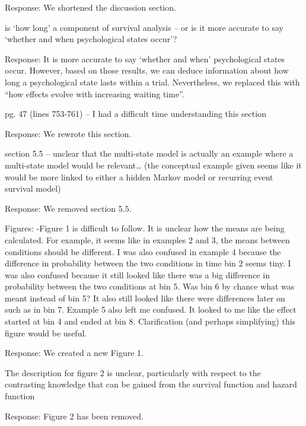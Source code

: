 \documentclass[
]{article}
\renewenvironment{quote}{\begin{leftbar}}{\end{leftbar}}
\begin{document}
Response: We shortened the discussion section.

\begin{quote}
is `how long' a component of survival analysis -- or is it more accurate
to say `whether and when psychological states occur'?
\end{quote}

Response: It is more accurate to say `whether and when' psychological
states occur. However, based on those results, we can deduce information
about how long a psychological state lasts within a trial. Nevertheless,
we replaced this with ``how effects evolve with increasing waiting
time''.

\begin{quote}
pg. 47 (lines 753-761) -- I had a difficult time understanding this
section
\end{quote}

Response: We rewrote this section.

\begin{quote}
section 5.5 -- unclear that the multi-state model is actually an example
where a multi-state model would be relevant\ldots{} (the conceptual
example given seems like it would be more linked to either a hidden
Markov model or recurring event survival model)
\end{quote}

Response: We removed section 5.5.

\begin{quote}
Figures: -Figure 1 is difficult to follow. It is unclear how the means
are being calculated. For example, it seems like in examples 2 and 3,
the means between conditions should be different. I was also confused in
example 4 because the difference in probability between the two
conditions in time bin 2 seems tiny. I was also confused because it
still looked like there was a big difference in probability between the
two conditions at bin 5. Was bin 6 by chance what was meant instead of
bin 5? It also still looked like there were differences later on such as
in bin 7. Example 5 also left me confused. It looked to me like the
effect started at bin 4 and ended at bin 8. Clarification (and perhaps
simplifying) this figure would be useful.
\end{quote}

Response: We created a new Figure 1.

\begin{quote}
The description for figure 2 is unclear, particularly with respect to
the contrasting knowledge that can be gained from the survival function
and hazard function
\end{quote}

Response: Figure 2 has been removed.
\end{document}
